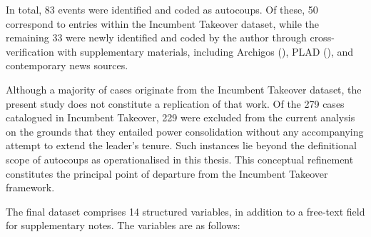 \documentclass[
  12pt,
]{report}
\begin{document}
\begin{table}

\caption{\label{tbl-source}Main Data Sources for Coding the Autocoup
Dataset}


\end{table}%

In total, 83 events were identified and coded as autocoups. Of these, 50
correspond to entries within the Incumbent Takeover dataset, while the
remaining 33 were newly identified and coded by the author through
cross-verification with supplementary materials, including Archigos
(), PLAD
(), and
contemporary news sources.

Although a majority of cases originate from the Incumbent Takeover
dataset, the present study does not constitute a replication of that
work. Of the 279 cases catalogued in Incumbent Takeover, 229 were
excluded from the current analysis on the grounds that they entailed
power consolidation without any accompanying attempt to extend the
leader's tenure. Such instances lie beyond the definitional scope of
autocoups as operationalised in this thesis. This conceptual refinement
constitutes the principal point of departure from the Incumbent Takeover
framework.

The final dataset comprises 14 structured variables, in addition to a
free-text field for supplementary notes. The variables are as follows:
\end{document}
